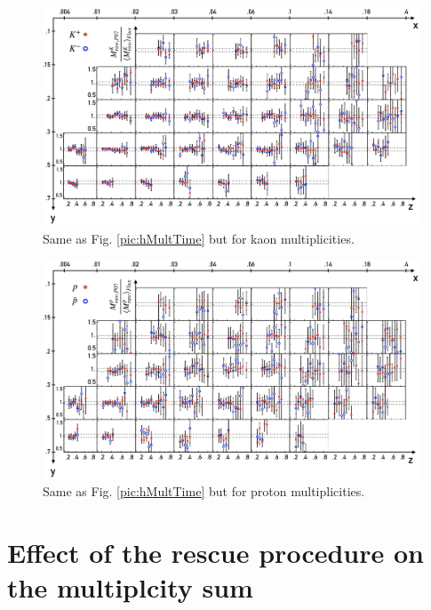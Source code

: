 \begin{figure}
  \centering
	\includegraphics[scale=0.7]{./gfx/SysTimeMultk.png}
	\caption{Same as Fig. \ref{pic:hMultTime} but for kaon multiplicities.}
	\label{pic:kMultTime}
\end{figure}

\begin{figure}
  \centering
	\includegraphics[scale=0.7]{./gfx/SysTimeMultp.png}
	\caption{Same as Fig. \ref{pic:hMultTime} but for proton multiplicities.}
	\label{pic:pMultTime}
\end{figure}

\newpage


\section{Effect of the rescue procedure on the multiplcity sum}

